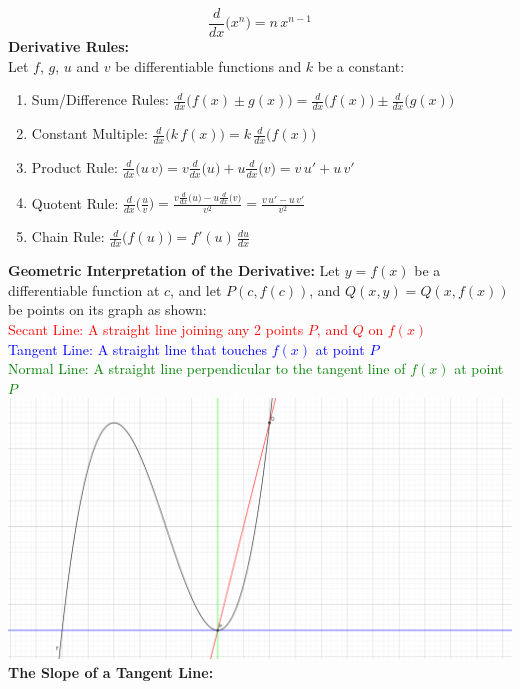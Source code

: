 \documentclass[14pt]{article}
\begin{document}
    $$\frac{d}{dx}\Big(x^n \Big)=n\,x^{n-1} $$ \textbf{Derivative
    Rules:}\\
    Let $f$, $g$, $u$ and $v$ be differentiable functions and $k$ be a
    constant:
    \begin{enumerate}
        \item Sum/Difference Rules: $\frac{d}{dx}\Big(f(x)\pm
        g(x)\Big)=\frac{d}{dx}\Big(f(x)\Big)\pm\frac{d}{dx}\Big(g(x)\Big)$
        \item Constant Multiple: $\frac{d}{dx}\Big(k\, f(x)\Big)=k\,
        \frac{d}{dx}\Big(f(x)\Big)$
        \item Product Rule:
        $\frac{d}{dx}\Big(u\,v\Big)=v\frac{d}{dx}\Big(u\Big)+u\frac{d}{dx}\Big(v\Big)=
        v\,u'+u\,v'$
        \item Quotent Rule:
        $\frac{d}{dx}\Big(\frac{u}{v}\Big)=\frac{v\frac{d}{dx}\big(u\big)-u\frac{d}{dx}\big(v\big)}{v^2}=\frac{v\,u'-u\,v'}{v^2}$
        \item Chain Rule:
        $\frac{d}{dx}\Big(f(u)\Big)=f'(u)\,\frac{du}{dx}$
    \end{enumerate}
    \textbf{Geometric Interpretation of the Derivative:}
    Let $y=f(x)$ be a differentiable function at $c$, and let $P(c,
    f(c))$, and $Q(x,y)=Q(x, f(x))$ be points on its graph as shown:\\
    \textcolor{red}{Secant Line: A straight line joining any 2 points
    $P$, and $Q$ on $f(x)$}\\
    \textcolor{blue}{Tangent Line: A straight line that touches $f(x)$
    at point $P$}\\
    \textcolor{green}{Normal Line: A straight line perpendicular to the
    tangent line of $f(x)$ at point $P$}\\
    \includegraphics[width=\textwidth]{fig1.png}\\
    \textbf{The Slope of a Tangent Line:}\\
\end{document}
